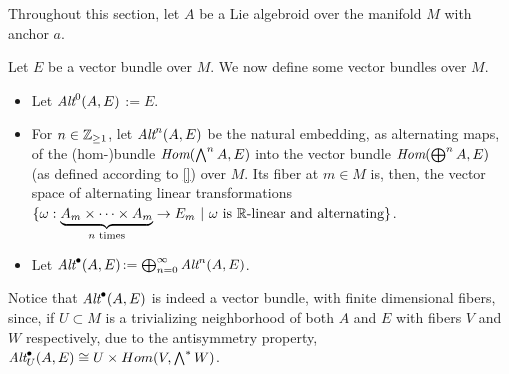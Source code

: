 \linea 

Throughout this section, let $A$ be a Lie algebroid over the manifold $M$ with anchor $a$.

\begin{definition}
Let $E$ be a vector bundle over $M$. We now define some vector bundles over $M$.
    \begin{itemize}
    
    \item Let \emph{$\operatorname{\textit{Alt}}^0(A, E)$}$:= E$. 
    
    \item For $n \in \mathbb{Z}_{\geq 1}$, let \emph{$\operatorname{\textit{Alt}}^n(A, E)$} be the natural embedding, as alternating maps, of the (hom-)bundle $\operatorname{\textit{Hom}}(\bigwedge^n A, E)$ into the vector bundle $\operatorname{\textit{Hom}}(\bigoplus^n A, E)$ (as defined according to \ref{}) over $M$. Its fiber at $m \in M$ is, then, the vector space of alternating linear transformations $\{\omega: \underbrace{A_m \times \cdots \times A_m}_{\text{$n$ times}} \to E_m \ |\  \text{$\omega$ is $\mathbb{R}$-linear and alternating}\}$.
    
    \item Let \emph{$\operatorname{\textit{Alt}}^\bullet(A, E)$}$:= \bigoplus^\infty_{n = 0} \operatorname{\textit{Alt}}^n(A, E)$.
    
        
    \end{itemize}
    
\end{definition}

Notice that $\operatorname{\textit{Alt}}^\bullet(A, E)$ is indeed a vector bundle, with finite dimensional fibers, since, if $U \subset M$ is a trivializing neighborhood of both $A$ and $E$ with fibers $V$ and $W$ respectively, due to the antisymmetry property, $\operatorname{\textit{Alt}}_U^\bullet(A, E) \cong U \times Hom(V, \bigwedge^* W)$.

